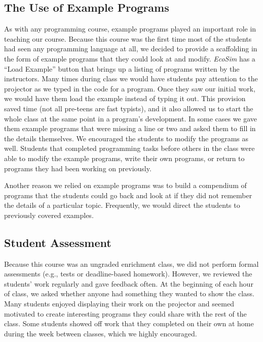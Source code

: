 \documentclass{sig-alternate}
\begin{document}
\subsection{The Use of Example Programs}
As with any programming course, example programs played an important role in teaching our course.
Because this course was the first time most of the students had seen any programming language at all, we decided to provide a scaffolding in the form of example programs that they could look at and modify.  
\emph{EcoSim} has a ``Load Example'' button that brings up a listing of programs written by the instructors.  
Many times during class we would have students pay attention to the projector as we typed in the code for a program.
Once they saw our initial work, we would have them load the example instead of typing it out.  
This provision saved time (not all pre-teens are fast typists), and it also allowed us to start the whole class at the same point in a program's development.  
In some cases we gave them example programs that were missing a line or two and asked them to fill in the details themselves.  
We encouraged the students to modify the programs as well.
Students that completed programming tasks before others in the class were able to modify the example programs, write their own programs, or return to programs they had been working on previously.

Another reason we relied on example programs was to build a compendium of programs that the students
could go back and look at if they did not remember the details of a particular topic.  Frequently,
we would direct the students to previously covered examples.


\subsection{Student Assessment}\nobreak
Because this course was an ungraded enrichment class, we did not perform formal assessments (e.g., tests or deadline-based homework). 
However, we reviewed the students' work regularly and gave feedback often.  
At the beginning of each hour of class, we asked whether anyone had something they wanted to show the class.  
Many students enjoyed displaying their work on the projector and seemed motivated to create interesting programs they could share with the rest of the class.  
Some students showed off work that they completed on their own at home during the week between classes, which we highly encouraged.
\end{document}
